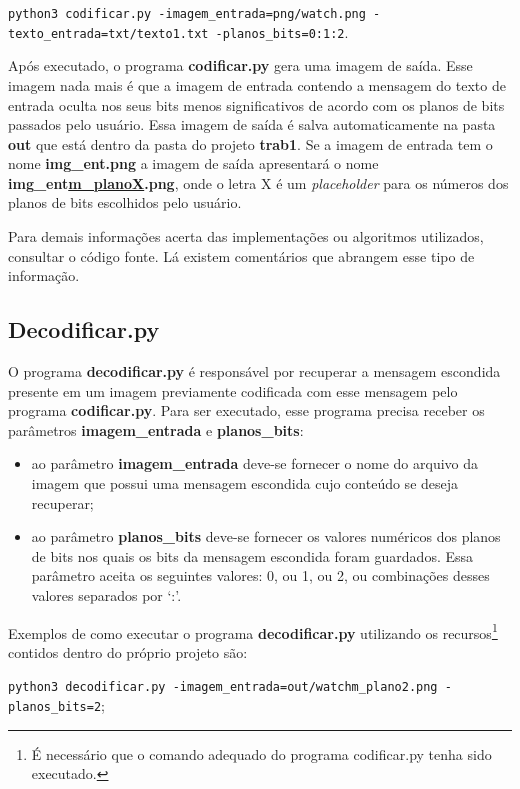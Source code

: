 \documentclass{article}
\begin{document}
\lstinline{python3 codificar.py -imagem_entrada=png/watch.png -texto_entrada=txt/texto1.txt -planos_bits=0:1:2}.

\noindent
Após executado, o programa \textbf{codificar.py} gera uma imagem de saída. Esse imagem nada mais é que a imagem de entrada contendo a mensagem do texto de entrada oculta nos seus bits menos significativos de acordo com os planos de bits passados pelo usuário. Essa imagem de saída é salva automaticamente na pasta \textbf{out} que está dentro da pasta do projeto \textbf{trab1}. Se a imagem de entrada tem o nome \textbf{img\_ent.png} a imagem de saída apresentará o nome \textbf{img\_ent\underline{m\_planoX}.png}, onde o letra X é um \textit{placeholder} para os números dos planos de bits escolhidos pelo usuário.

Para demais informações acerta das implementações ou algoritmos utilizados, consultar o código fonte. Lá existem comentários que abrangem esse tipo de informação.

%
\subsection{Decodificar.py}
O programa \textbf{decodificar.py} é responsável por recuperar a mensagem escondida presente em um imagem previamente codificada com esse mensagem pelo programa \textbf{codificar.py}. Para ser executado, esse programa precisa receber os parâmetros \textbf{imagem\_entrada} e \textbf{planos\_bits}:

\begin{itemize}
	\item ao parâmetro \textbf{imagem\_entrada} deve-se fornecer o nome do arquivo da imagem que possui uma mensagem escondida cujo conteúdo se deseja recuperar;
	\item ao parâmetro \textbf{planos\_bits} deve-se fornecer os valores numéricos dos planos de bits nos quais os bits da mensagem escondida foram guardados. Essa parâmetro aceita os seguintes valores: 0, ou 1, ou 2, ou combinações desses valores separados por `:'.
\end{itemize}

\noindent
Exemplos de como executar o programa \textbf{decodificar.py} utilizando os recursos\footnote{É necessário que o comando adequado do programa codificar.py tenha sido executado.\label{refnote}} contidos dentro do próprio projeto são:

\lstinline{python3 decodificar.py -imagem_entrada=out/watchm_plano2.png -planos_bits=2};
\end{document}

